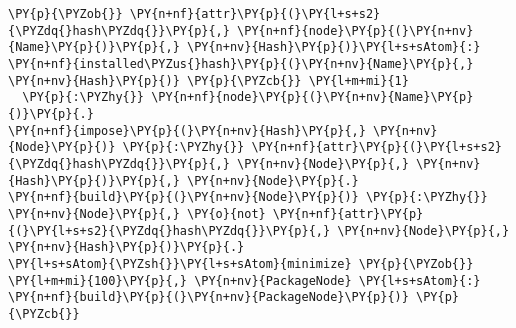 \begin{Verbatim}[commandchars=\\\{\},fontsize=\footnotesize]
\PY{p}{\PYZob{}} \PY{n+nf}{attr}\PY{p}{(}\PY{l+s+s2}{\PYZdq{}hash\PYZdq{}}\PY{p}{,} \PY{n+nf}{node}\PY{p}{(}\PY{n+nv}{Name}\PY{p}{)}\PY{p}{,} \PY{n+nv}{Hash}\PY{p}{)}\PY{l+s+sAtom}{:} \PY{n+nf}{installed\PYZus{}hash}\PY{p}{(}\PY{n+nv}{Name}\PY{p}{,} \PY{n+nv}{Hash}\PY{p}{)} \PY{p}{\PYZcb{}} \PY{l+m+mi}{1}
  \PY{p}{:\PYZhy{}} \PY{n+nf}{node}\PY{p}{(}\PY{n+nv}{Name}\PY{p}{)}\PY{p}{.}
\PY{n+nf}{impose}\PY{p}{(}\PY{n+nv}{Hash}\PY{p}{,} \PY{n+nv}{Node}\PY{p}{)} \PY{p}{:\PYZhy{}} \PY{n+nf}{attr}\PY{p}{(}\PY{l+s+s2}{\PYZdq{}hash\PYZdq{}}\PY{p}{,} \PY{n+nv}{Node}\PY{p}{,} \PY{n+nv}{Hash}\PY{p}{)}\PY{p}{,} \PY{n+nv}{Node}\PY{p}{.}
\PY{n+nf}{build}\PY{p}{(}\PY{n+nv}{Node}\PY{p}{)} \PY{p}{:\PYZhy{}} \PY{n+nv}{Node}\PY{p}{,} \PY{o}{not} \PY{n+nf}{attr}\PY{p}{(}\PY{l+s+s2}{\PYZdq{}hash\PYZdq{}}\PY{p}{,} \PY{n+nv}{Node}\PY{p}{,} \PY{n+nv}{Hash}\PY{p}{)}\PY{p}{.}
\PY{l+s+sAtom}{\PYZsh{}}\PY{l+s+sAtom}{minimize} \PY{p}{\PYZob{}} \PY{l+m+mi}{100}\PY{p}{,} \PY{n+nv}{PackageNode} \PY{l+s+sAtom}{:} \PY{n+nf}{build}\PY{p}{(}\PY{n+nv}{PackageNode}\PY{p}{)} \PY{p}{\PYZcb{}}
\end{Verbatim}
